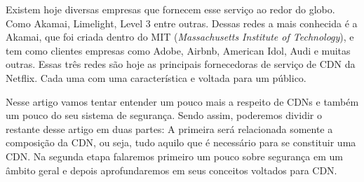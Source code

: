 Existem hoje diversas empresas que fornecem esse servi\c{c}o ao redor do globo. Como Akamai, Limelight, Level 3 entre outras. Dessas redes a mais conhecida \'e a Akamai, que foi criada dentro do MIT (\textit{Massachusetts Institute of Technology}), e tem como clientes empresas como Adobe, Airbnb, American Idol, Audi e muitas outras. Essas tr\^es redes s\~ao hoje as principais fornecedoras de servi\c{c}o de CDN da Netflix. Cada uma com uma caracter\'istica e voltada para um p\'ublico.

Nesse artigo vamos tentar entender um pouco mais a respeito de CDNs e tamb\'em um pouco do seu sistema de seguran\c{c}a. Sendo assim, poderemos dividir o restante desse artigo em duas partes: A primeira ser\'a relacionada somente a composi\c{c}\~ao da CDN, ou seja, tudo aquilo que \'e necess\'ario para se constituir uma CDN. Na segunda etapa falaremos primeiro um pouco sobre seguran\c{c}a em um \^ambito geral e depois aprofundaremos em seus conceitos voltados para CDN.